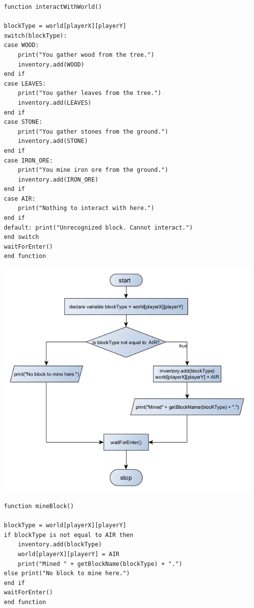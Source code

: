 \begin{lstlisting}
function interactWithWorld()

blockType = world[playerX][playerY]
switch(blockType):
case WOOD: 
	print("You gather wood from the tree.")
	inventory.add(WOOD)
end if
case LEAVES:
	print("You gather leaves from the tree.")
	inventory.add(LEAVES)
end if
case STONE:
	print("You gather stones from the ground.")
	inventory.add(STONE)
end if
case IRON_ORE:
	print("You mine iron ore from the ground.")
	inventory.add(IRON_ORE)
end if
case AIR:
	print("Nothing to interact with here.")
end if
default: print("Unrecognized block. Cannot interact.")
end switch
waitForEnter()
end function
\end{lstlisting}
\newpage

{\includegraphics[width=\textwidth]{../flowchart/mineBlock.png}}
\begin{lstlisting}
function mineBlock()

blockType = world[playerX][playerY]
if blockType is not equal to AIR then 
	inventory.add(blockType)
	world[playerX][playerY] = AIR
	print("Mined " + getBlockName(blockType) + ".")
else print("No block to mine here.")
end if
waitForEnter()
end function
\end{lstlisting}
\newpage
